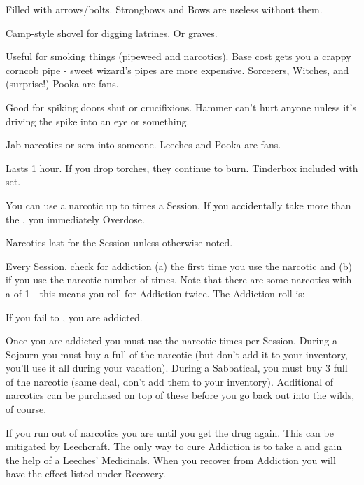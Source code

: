 {\begin{multicols}{2}
   Filled with arrows/bolts.  Strongbows and Bows are useless without them.
  
   Camp-style shovel for digging latrines.  Or graves.
  
   Useful for smoking things (pipeweed and narcotics). Base cost gets you a crappy corncob pipe - sweet wizard's pipes are more expensive.  Sorcerers, Witches, and (surprise!) Pooka are fans.
  
   Good for spiking doors shut or crucifixions.  Hammer can't hurt anyone unless it's driving the spike into an eye or something.
  
   Jab narcotics or sera into someone.  Leeches and Pooka are fans.
  
   Lasts 1 hour. If you drop torches, they continue to burn.  Tinderbox included with set.

  \newpage


  You can use a narcotic up to \MAX times a Session.  If you accidentally take more than the \MAX, you immediately Overdose. 

  Narcotics last for the Session unless otherwise noted.

  Every Session, check for addiction (a) the first time you use the narcotic and (b) if you use the narcotic \MAX number of times.  Note that there are some narcotics with a \MAX of 1 - this means you roll for Addiction twice. The Addiction roll is:


  If you fail to \RO, you are addicted.  

  Once you are addicted you must use the narcotic \MAX times per Session.  During a Sojourn you must buy a full \UD of the narcotic (but don't add it to your inventory, you'll use it all during your vacation).  During a Sabbatical, you must buy 3 full \UD of the narcotic (same deal, don't add them to your inventory).  Additional \UD of narcotics can be purchased on top of these before you go back out into the wilds, of course.

  If you run out of narcotics you are  until you get the drug again.  This can be mitigated by Leechcraft. The only way to cure Addiction is to take a  and gain the help of a Leeches' Medicinals\footnotemark.  When you recover from Addiction you will have the effect listed under Recovery.



\end{multicols}}

